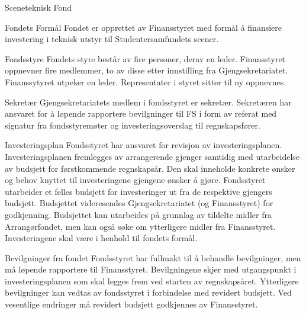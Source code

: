 \begin{fond}{Sceneteknisk Fond}
    \begin{fondsparagraf}{Fondets Formål}
        Fondet er opprettet av Finansstyret med formål å finansiere investering i teknisk
        utstyr til Studentersamfundets scener.
    \end{fondsparagraf}

    \begin{fondsparagraf}{Fondsstyre}
        Fondets styre består av fire personer, derav en leder. Finansstyret oppnevner fire
        medlemmer, to av disse etter innstilling fra Gjengsekretariatet. Finanssytyret
        utpeker en leder. Representater i styret sitter til ny oppnevnes.
    \end{fondsparagraf}

    \begin{fondsparagraf}{Sekretær}
        Gjengsekretariatets medlem i fondsstyret er sekretær. Sekretæren har ansvaret for å
        løpende rapportere bevilgninger til
        FS i form av referat med signatur fra fondsstyremøter og investeringsoverslag til
        regnskapsfører.
    \end{fondsparagraf}

    \begin{fondsparagraf}{Investeringsplan}
        Fondsstyret har ansvaret for revisjon av investeringsplanen. Investeringsplanen fremlegges
        av arrangerende gjenger samtidig med utarbeidelse av budsjett for førstkommende regnskapsår. Den skal inneholde
        konkrete ønsker og behov knyttet til investeringene gjengene ønsker å gjøre. Fondsstyret utarbeider et felles
        budsjett for investeringer ut fra de respektive gjengers budsjett. Budsjettet videresendes Gjengsekretariatet (og Finansstyret)
        for godkjenning. Budsjettet kan utarbeides på grunnlag av tildelte midler fra Arrangørfondet, men kan også søke om
        ytterligere midler fra Finansstyret. Investeringene skal være i henhold til fondets formål.
    \end{fondsparagraf}

    \begin{fondsparagraf}{Bevilgninger fra fondet}
        Fondsstyret har fullmakt til å behandle bevilgninger, men må løpende rapportere til
        Finansstyret. Bevilgningene skjer
        med utgangspunkt i investeringsplanen som skal legges frem ved starten av regnskapsåret.
        Ytterligere bevilgninger
        kan vedtas av fondsstyret i forbindelse med revidert budsjett. Ved vesentlige endringer må
        revidert budsjett godkjennes av Finansstyret.
    \end{fondsparagraf}


\end{fond}
